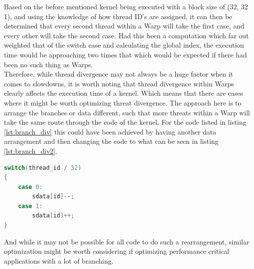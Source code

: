 Based on the before mentioned kernel being executed with a block size of (32, 32 1), and using the knowledge of how thread ID's are assigned, it can then be determined that every second thread within a Warp will take the first case, and every other will take the second case. Had this been a computation which far out weighted that of the switch case and calculating the global index, the execution time would be approaching two times that which would be expected if there had been no such thing as Warps.\\

Therefore, while thread divergence may not always be a huge factor when it comes to slowdowns, it is worth noting that thread divergence within Warps clearly affects the execution time of a kernel. Which means that there are cases where it might be worth optimizing threat divergence. The approach here is to arrange the branches or data different, such that more threats within a Warp will take the same route through the code of the kernel. For the code listed in listing \ref{lst:branch_div} this could have been achieved by having another data arrangement and then changing the code to what can be seen in listing \ref{lst:branch_div2}.

\begin{lstlisting}[language=C,caption={Creating a better arrangement of threads to allign with warps},label=lst:branch_div2]
switch(thread_id / 32)
{
	case 0:
		sdata[id]--;
	case 1:
		sdata[id]++;
}
\end{lstlisting} 

And while it may not be possible for all code to do such a rearrangement, similar optimization might be worth considering if optimizing performance critical applications with a lot of branching.